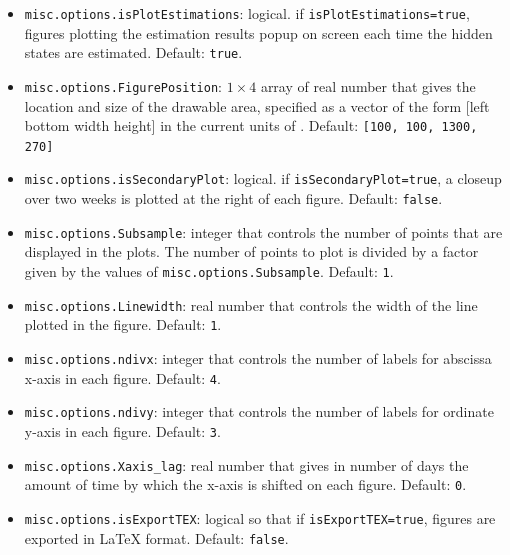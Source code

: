 \begin{itemize}
\begin{itemize}
\item \lstinline[basicstyle = \mlttfamily \small ]!misc.options.isPlotEstimations!: logical. if \lstinline[basicstyle = \mlttfamily \small ]!isPlotEstimations=true!, figures plotting the estimation results popup on screen each time the hidden states are estimated. Default: \lstinline[basicstyle = \mlttfamily \small ]!true!.
\item \lstinline[basicstyle = \mlttfamily \small ]!misc.options.FigurePosition!: $1\times4$ array of real number that gives the location and size of the drawable area, specified as a vector of the form [left bottom width height] in the current units of \MATLAB{}. Default: \lstinline[basicstyle = \mlttfamily \small ]![100, 100, 1300, 270]!
\item \lstinline[basicstyle = \mlttfamily \small ]!misc.options.isSecondaryPlot!: logical. if \lstinline[basicstyle = \mlttfamily \small ]!isSecondaryPlot=true!, a closeup over two weeks is plotted at the right of each figure. Default: \lstinline[basicstyle = \mlttfamily \small ]!false!.
\item \lstinline[basicstyle = \mlttfamily \small ]!misc.options.Subsample!: integer that controls the number of points that are displayed in the plots. The number of points to plot is divided by a factor given by the values of \lstinline[basicstyle = \mlttfamily \small ]!misc.options.Subsample!. Default: \lstinline[basicstyle = \mlttfamily \small ]!1!.
\item \lstinline[basicstyle = \mlttfamily \small ]!misc.options.Linewidth!: real number that controls the width of the line plotted in the figure. Default: \lstinline[basicstyle = \mlttfamily \small ]!1!.
\item \lstinline[basicstyle = \mlttfamily \small ]!misc.options.ndivx!: integer that controls the number of labels for abscissa x-axis in each figure. Default: \lstinline[basicstyle = \mlttfamily \small ]!4!.
\item \lstinline[basicstyle = \mlttfamily \small ]!misc.options.ndivy!: integer that controls the number of labels for ordinate y-axis in each figure. Default: \lstinline[basicstyle = \mlttfamily \small ]!3!.
\item \lstinline[basicstyle = \mlttfamily \small ]!misc.options.Xaxis_lag!: real number that gives in number of days the amount of time by which the x-axis is shifted on each figure. Default: \lstinline[basicstyle = \mlttfamily \small ]!0!. 
\item \lstinline[basicstyle = \mlttfamily \small ]!misc.options.isExportTEX!: logical so that if \lstinline[basicstyle = \mlttfamily \small ]!isExportTEX=true!, figures are exported in \LaTeX{} format. Default: \lstinline[basicstyle = \mlttfamily \small ]!false!.

\end{itemize}
\end{itemize}
